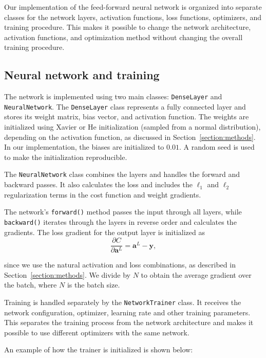 \documentclass[amssymb,secnumarabic,twocolumn,aps]{revtex4}
\begin{document}
Our implementation of the feed-forward neural network is organized into separate classes for the network layers, activation functions, loss functions, optimizers, and training procedure. This makes it possible to change the network architecture, activation functions, and optimization method without changing the overall training procedure.

\subsection{Neural network and training}

The network is implemented using two main classes: \texttt{DenseLayer} and \texttt{NeuralNetwork}. The \texttt{DenseLayer} class represents a fully connected layer and stores its weight matrix, bias vector, and activation function.
The weights are initialized using Xavier or He initialization (sampled from a normal distribution), depending on the activation function, as discussed in Section~\ref{section:methods}. In our implementation, the biases are initialized to $0.01$. A random seed is used to make the initialization reproducible.

The \texttt{NeuralNetwork} class combines the layers and handles the forward and backward passes. It also calculates the loss and includes the $\ell_1$ and $\ell_2$ regularization terms in the cost function and weight gradients.

The network's \texttt{forward()} method passes the input through all layers, while \texttt{backward()} iterates through the layers in reverse order and calculates the gradients. The loss gradient for the output layer is initialized as
\begin{equation*}
    \frac{\partial C}{\partial\boldsymbol{a}^L}
    =
    \boldsymbol{a}^L-\boldsymbol{y},
\end{equation*}

since we use the natural activation and loss combinations, as described in Section~\ref{section:methods}. We divide by $N$ to obtain the average gradient over the batch, where $N$ is the batch size.

Training is handled separately by the \texttt{NetworkTrainer} class. It receives the network configuration, optimizer, learning rate and other training parameters. This separates the training process from the network architecture and makes it possible to use different optimizers with the same network.

An example of how the trainer is initialized is shown below:
\end{document}
